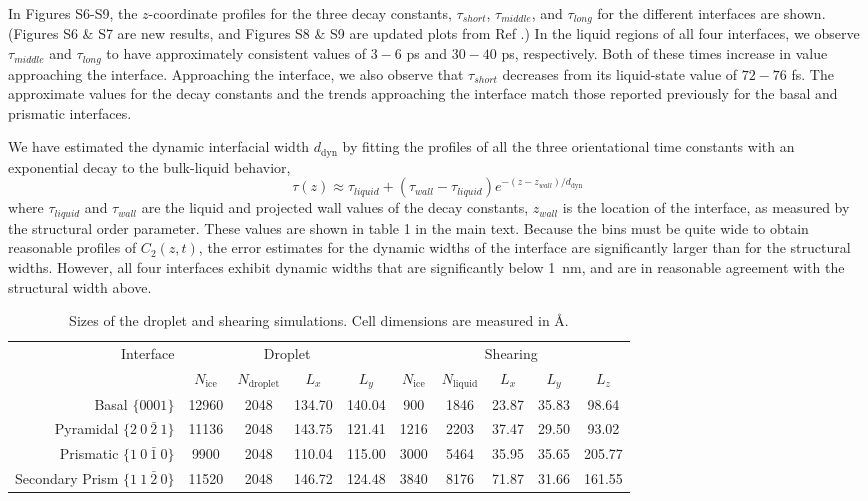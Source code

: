 \documentclass{pnastwo}
\begin{document}
\begin{article}
In Figures S6-S9, the $z$-coordinate profiles for the three decay
constants, $\tau_{short}$, $\tau_{middle}$, and $\tau_{long}$ for the
different interfaces are shown.  (Figures S6 \& S7 are new results,
and Figures S8 \& S9 are updated plots from Ref \citealp{Louden13}.)
In the liquid regions of all four interfaces, we observe
$\tau_{middle}$ and $\tau_{long}$ to have approximately consistent
values of $3-6$ ps and $30-40$ ps, respectively.  Both of these times
increase in value approaching the interface.  Approaching the
interface, we also observe that $\tau_{short}$ decreases from its
liquid-state value of $72-76$ fs.  The approximate values for the
decay constants and the trends approaching the interface match those
reported previously for the basal and prismatic interfaces.

We have estimated the dynamic interfacial width $d_\mathrm{dyn}$ by
fitting the profiles of all the three orientational time constants
with an exponential decay to the bulk-liquid behavior,
\begin{equation}\label{tauFit}
  \tau(z)\approx\tau_{liquid}+(\tau_{wall}-\tau_{liquid})e^{-(z-z_{wall})/d_\mathrm{dyn}}
\end{equation}
where $\tau_{liquid}$ and $\tau_{wall}$ are the liquid and projected
wall values of the decay constants, $z_{wall}$ is the location of the
interface, as measured by the structural order parameter.  These
values are shown in table 1 in the main text. Because the bins must be
quite wide to obtain reasonable profiles of $C_2(z,t)$, the error
estimates for the dynamic widths of the interface are significantly
larger than for the structural widths.  However, all four interfaces
exhibit dynamic widths that are significantly below 1~nm, and are in
reasonable agreement with the structural width above.


\end{article}

\begin{table}[h]
\centering
\caption{Sizes of the droplet and shearing simulations.  Cell
  dimensions are measured in \AA. \label{tab:method}}
\begin{tabular}{r|cccc|ccccc} 
\toprule
 \multirow{2}{*}{Interface} & \multicolumn{4}{c|}{Droplet} & \multicolumn{5}{c}{Shearing} \\
  & $N_\mathrm{ice}$ & $N_\mathrm{droplet}$ & $L_x$ & $L_y$ & $N_\mathrm{ice}$ & $N_\mathrm{liquid}$ & $L_x$ & $L_y$ & $L_z$  \\ 
\midrule
Basal  $\{0001\}$                    & 12960 & 2048 & 134.70 & 140.04 & 900 & 1846  & 23.87 & 35.83 & 98.64  \\
Pyramidal  $\{2~0~\bar{2}~1\}$       & 11136 & 2048 & 143.75 & 121.41 & 1216 & 2203 & 37.47 & 29.50 & 93.02  \\
Prismatic  $\{1~0~\bar{1}~0\}$       &  9900 & 2048 & 110.04 & 115.00 & 3000 & 5464 & 35.95 & 35.65 & 205.77 \\
Secondary Prism  $\{1~1~\bar{2}~0\}$ & 11520 & 2048 & 146.72 & 124.48 & 3840 & 8176 & 71.87 & 31.66 & 161.55 \\
\bottomrule
\end{tabular}
\end{table}
\end{document}
